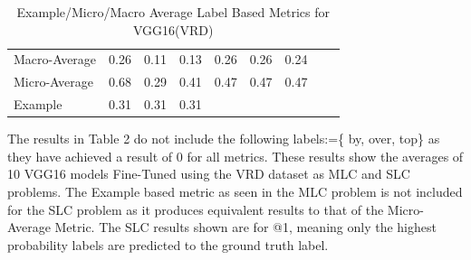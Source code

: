 \documentclass{csfyp}
\begin{document}
\begin{table}[!htbp]
\begin{tabular}{|l|l|l|l|l|l|l|l|l}
Macro-Average &	0.26	&	0.11	&	0.13	&	0.26	&	0.26	&	0.24 \\ \cline{1-7}
Micro-Average &	0.68	&	0.29	&	0.41	&	0.47	&	0.47	&	0.47 \\ \cline{1-7}
Example       &	0.31	&	0.31	&	0.31  \\ \cline{1-4}
\end{tabular}
\caption{Example/Micro/Macro Average Label Based Metrics for VGG16(VRD)}
The results in Table 2 do not include the following labels:=\{ by, over, top\} as they have achieved a result of 0 for all metrics. These results show the averages of 10 VGG16 models Fine-Tuned using the VRD dataset as MLC and SLC problems. The Example based metric as seen in the MLC problem is not included for the SLC problem as it produces equivalent results to that of the Micro-Average Metric.  The SLC results shown are for @1, meaning only the highest probability labels are predicted to the ground truth label.
\vspace{-4mm}
\end{table}
\end{document}
